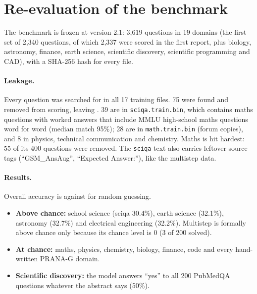 \documentclass[11pt,a4paper]{article}
\begin{document}
\section{Re-evaluation of the benchmark}\label{sec:bench}
The benchmark is frozen at version 2.1: 3,619 questions in 19 domains (the first set of 2,340 questions, of which 2,337 were scored in the first report,
plus biology, astronomy, finance, earth science, scientific discovery, scientific programming and CAD), with a SHA-256 hash for every file.

\paragraph{Leakage.} Every question was searched for in all 17 training files. 75 were found and removed from scoring, leaving \EvalItems.
39 are in \texttt{sciqa.train.bin}, which contains maths questions with worked answers that include MMLU high-school maths questions
word for word (median match 95\%); 28 are in \texttt{math.train.bin} (forum copies), and 8 in physics, technical communication and chemistry.
Maths is hit hardest: 55 of its 400 questions were removed. The \texttt{sciqa} text also carries leftover source tags (``GSM\_AnsAug'',
``Expected Answer:''), like the multistep data.

\paragraph{Results.} Overall accuracy is \EvalAcc{} against \EvalChance{} for random guessing.

\begin{table}[H]\centering\small

\caption{Benchmark accuracy by domain (multiple choice: random guessing 25\%, PubMedQA yes/no 50\%; GSM8K numeric: 0\%).}
\end{table}

\begin{itemize}
\item \textbf{Above chance:} school science (sciqa 30.4\%), earth science (32.1\%), astronomy (32.7\%) and electrical engineering (32.2\%).
  Multistep is formally above chance only because its chance level is 0 (3 of 200 solved).
\item \textbf{At chance:} maths, physics, chemistry, biology, finance, code and every hand-written PRANA-G domain.
\item \textbf{Scientific discovery:} the model answers ``yes'' to all 200 PubMedQA questions whatever the abstract says (50\%).
\end{itemize}
\end{document}
